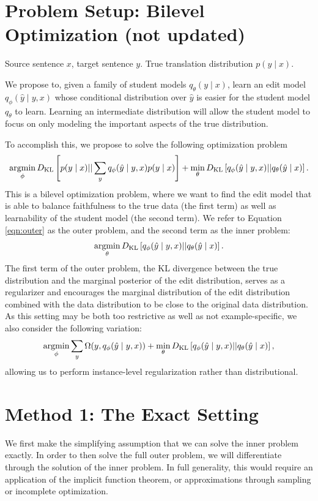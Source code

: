 \documentclass[11pt]{article}
\begin{document}
\section{Problem Setup: Bilevel Optimization (not updated)}
Source sentence $x$, target sentence $y$.
True translation distribution $p(y \mid x)$.

We propose to, given a family of student models $q_\theta(y \mid x)$,
learn an edit model $q_\phi(\hat{y} \mid y, x)$ whose conditional distribution over $\hat{y}$
is easier for the student model $q_\theta$ to learn.
Learning an intermediate distribution will allow the student model to focus on only modeling
the important aspects of the true distribution.

To accomplish this, we propose to solve the following optimization problem
\begin{equation}
    \label{eqn:outer}
    \operatorname*{argmin}_\phi D_\mathrm{KL}\left[p(y \mid x) || \sum_y q_\phi(\hat{y} \mid y, x)p(y \mid x)\right]
    + \min_\theta D_\mathrm{KL}\left[q_\phi(\hat{y} \mid y, x) || q_\theta(\hat{y} \mid x)\right].
\end{equation}
This is a bilevel optimization problem, where we want to find the edit model
that is able to balance faithfulness to the true data (the first term)
as well as learnability of the student model (the second term).
We refer to Equation \ref{eqn:outer} as the outer problem,
and the second term as the inner problem:
\begin{equation}
    \label{eqn:inner}
    \operatorname*{argmin}_\theta D_\mathrm{KL}\left[q_\phi(\hat{y} \mid y, x) || q_\theta(\hat{y} \mid x)\right].
\end{equation}
The first term of the outer problem, the KL divergence between the true distribution
and the marginal posterior of the edit distribution,
serves as a regularizer and encourages the marginal distribution of
the edit distribution combined with the data distribution to be close to the
original data distribution.
As this setting may be both too restrictive as well as not example-specific,
we also consider the following variation:
\begin{equation}
    \label{eqn:regularized-bilevel}
    \operatorname*{argmin}_\phi \sum_y \Omega(y, q_\phi(\hat{y} \mid y, x))
    + \min_\theta D_\mathrm{KL}\left[q_\phi(\hat{y} \mid y, x) || q_\theta(\hat{y} \mid x)\right],
\end{equation}
allowing us to perform instance-level regularization rather than distributional.

\section{Method 1: The Exact Setting}
We first make the simplifying assumption that we can solve the inner problem exactly.
In order to then solve the full outer problem, we will differentiate through the solution of the
inner problem.
In full generality, this would require an application of the implicit function theorem,
or approximations through sampling or incomplete optimization.
\end{document}
